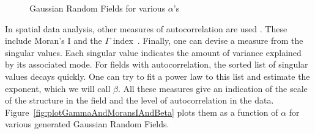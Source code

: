 \documentclass[sigconf]{acmart}
\begin{document}
\begin{figure}[h]
\begin{center}
\hfill
{}
\caption{Gaussian Random Fields for various $\alpha$'s}
\label{fig:GaussianRandomField}
\end{center}
\end{figure}
\vspace{-3mm}

In spatial data analysis, other measures of autocorrelation are used \cite{Eshel2011, Storch1999}. These include Moran's I and the $\Gamma$ index~\cite{Moran1950, Hubert1981, PySAL}. Finally, one can devise a measure from the singular values. Each singular value indicates the amount of variance explained by its associated mode. For fields with autocorrelation, the sorted list of singular values decays quickly. One can try to fit a power law to this list and estimate the exponent, which we will call $\beta$. %
All these measures give an indication of the scale of the structure in the field and the level of autocorrelation in the data. Figure~\ref{fig:plotGammaAndMoransIAndBeta} plots them as a function of $\alpha$ for various generated Gaussian Random Fields.
\end{document}
